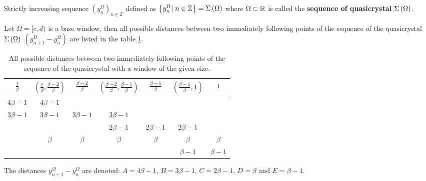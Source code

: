 \documentclass[text.tex]{subfiles}
\begin{document}
\begin{definition}
Strictly increasing sequence $(y_n^\Omega)_{n\in \mathbb{Z}}$ defined as $\left\{y_n^\Omega\,|\, n\in\mathbb{Z} \right\} = \Sigma\left(\Omega\right)$ where $\Omega \subset \mathbb{R}$ is called the \textbf{sequence of quasicrystal $\Sigma\left(\Omega\right)$}.
\end{definition}

\begin{theorem}
\label{the:spaces:sum}
Let $\Omega = [c,d)$ is a base window, then all possible distances between two immediately following points of the sequence of  the quasicrystal $\Sigma\left(\Omega\right)$ $\left(y_{n+1}^\Omega-y_n^\Omega\right)$ are listed in the table \ref{table:spaces}.
\begin{table}[h]
\begin{center}
\begin{tabular}{ccccccc}
	\toprule
		$\frac{1}{\beta}$	&	$\left( \frac{1}{\beta}, \frac{\beta - 2}{\beta} \right)$	&	$\frac{\beta-2}{\beta}$	&	$\left( \frac{\beta-2}{\beta}, \frac{\beta-1}{\beta} \right)$	&	$\frac{\beta-1}{\beta}$	&	$\left( \frac{\beta-1}{\beta}, 1 \right)$	&	$1$\\
	\midrule
		$4\beta-1$ 	&	$4\beta-1$	&				&				&				&				&			 	\\ 
		$3\beta-1$	&	$3\beta-1$	&	$3\beta-1$	&	$3\beta-1$	&				&				&			 	\\
					&				&				&	$2\beta-1$	&	$2\beta-1$	&	$2\beta-1$	&				\\
					&	$\beta$		&	$\beta$		&	$\beta$		&	$\beta$		&	$\beta$		&	$\beta$		\\
					&				&				&				&				&	$\beta-1$	&	$\beta-1$	\\
	\bottomrule
\end{tabular}
\caption{All possible distances between two immediately following points of the sequence of the quasicrystal with a window of the given size.}
\label{table:spaces}
\end{center}
\end{table}
%
\end{theorem}

\begin{definition}
\label{def:distancesNotation}
The distances $y_{n+1}^\Omega-y_n^\Omega$ are denoted: $A = 4\beta-1$, $B = 3\beta-1$, $C = 2\beta-1$, $D = \beta$ and $E = \beta-1$.
\end{definition}
\end{document}
